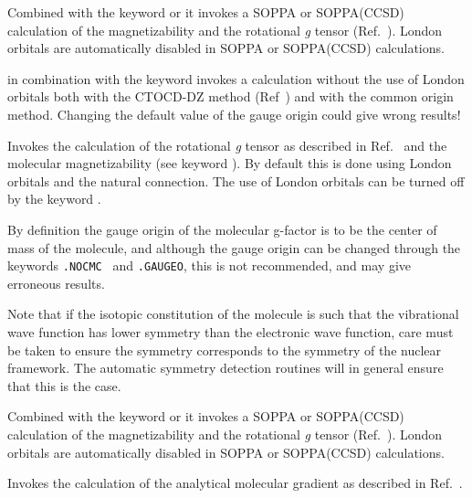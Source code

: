 \begin{description}
Combined with the keyword  or  it invokes a SOPPA 
or SOPPA(CCSD) calculation of the magnetizability and the rotational 
{\em g} tensor (Ref.~\cite{spascpl260}). London orbitals are automatically disabled in 
SOPPA or SOPPA(CCSD) calculations.

 in combination with the keyword  invokes a 
calculation without the use of London orbitals both with the CTOCD-DZ method 
(Ref~\cite{paololazz1,paololazz2}) and with the common origin method. 
Changing the default value of the gauge origin could give wrong results!


\item[\Key{MOLGFA}] Invokes the calculation of the rotational
{\em g} tensor as described in
Ref.~\cite{jgkrthjcp105} and the molecular 
magnetizability (see keyword ). By
default this is done 
using London orbitals  and the 
natural connection. The use of London
orbitals can be turned off by the keyword .

By definition the gauge origin of the molecular
g-factor is to be the 
center of mass of the molecule, and although the
gauge origin can be 
changed through the keywords \verb|.NOCMC | and \verb|.GAUGEO|, this
is not recommended, and may give erroneous results.

Note that if the isotopic constitution of the molecule is such that
the vibrational wave function has lower symmetry than the electronic
wave function, care must be taken to ensure the symmetry corresponds
to the symmetry of the nuclear framework. The automatic symmetry
detection routines will in general ensure that this is the case.

Combined with the keyword  or  it invokes a SOPPA 
or SOPPA(CCSD) calculation of the magnetizability and the 
rotational {\em g} tensor (Ref.~\cite{spascpl260}). London orbitals are automatically 
disabled in SOPPA or SOPPA(CCSD) calculations.

\item[\Key{MOLGRA}] Invokes the calculation of the analytical
molecular gradient as described in Ref.~\cite{tuhjahjajpjjcp84}.


\end{description}
